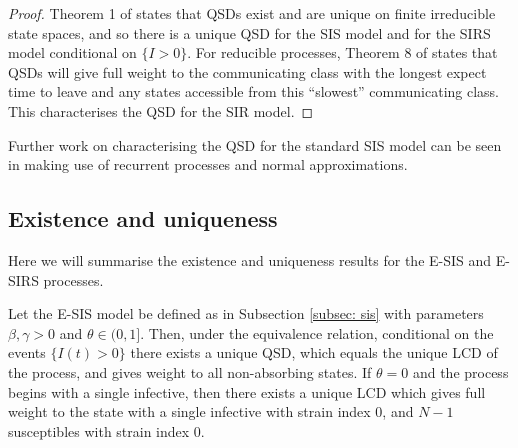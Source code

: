 \documentclass[review]{elsarticle}
\begin{document}
\begin{proof}
Theorem 1 of \cite{vanDoorn2008} states that QSDs exist and are unique on finite irreducible state spaces, and so there is a unique QSD for the SIS model and for the SIRS model conditional on $\{I > 0\}$. For reducible processes, Theorem 8 of \cite{vanDoorn2008} states that QSDs will give full weight to the communicating class with the longest expect time to leave and any states accessible from this ``slowest'' communicating class. This characterises the QSD for the SIR model.
\end{proof}

Further work on characterising the QSD for the standard SIS model can be seen in \cite{Nasell1999,clancy2003} making use of recurrent processes and normal approximations.

\subsection{Existence and uniqueness}\label{subsec: e and u}
Here we will summarise the existence and uniqueness results for the E-SIS and E-SIRS processes. 
\begin{mythm}\label{thm: eu SIStr}
	Let the E-SIS model be defined as in Subsection \ref{subsec: sis} with parameters $\beta, \gamma > 0$ and $\theta \in (0,1]$. Then, under the equivalence relation, conditional on the events $\{I(t) > 0\}$ there exists a unique QSD, which equals the unique LCD of the process, 	and gives weight to all non-absorbing states. If $\theta = 0$ and the process begins with a single infective, then there exists a unique LCD which gives full weight to the state with a single infective with strain index $0$, and $N-1$ susceptibles with strain index 0.
\end{mythm}
\end{document}
